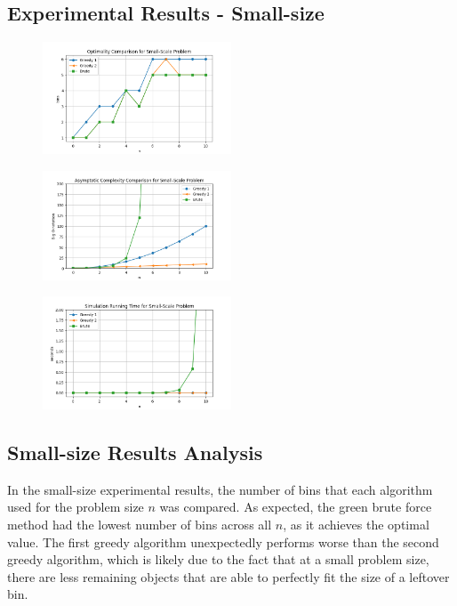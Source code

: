 \documentclass[11pt]{article}
\begin{document}
\begin{multicols}{2}
	\subsection{Experimental Results - Small-size}
	\begin{figure}[H]
		\centering
		\includegraphics[width=0.5\textwidth]{images/smallscale_optimality.png}
	\end{figure}
	\begin{figure}[H]
		\centering
		\includegraphics[width=0.5\textwidth]{images/smallscale_complexity.png}
	\end{figure}
	\begin{figure}[H]
		\centering
		\includegraphics[width=0.5\textwidth]{images/smallscale_simtime.png}
	\end{figure}

	\subsection{Small-size Results Analysis}
	In the small-size experimental results, the number of bins that each algorithm used for the problem
	size ${n}$ was compared. As expected, the green brute force method had the lowest number of bins
	across all ${n}$, as it achieves the optimal value. The first greedy algorithm unexpectedly performs
	worse than the second greedy algorithm, which is likely due to the fact that at a small problem
	size, there are less remaining objects that are able to perfectly fit the size of a leftover bin.


\end{multicols}
\end{document}
